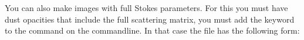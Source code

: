 \documentclass[letterpaper,10pt,english]{sphinxmanual}
\begin{document}
You can also make images with full Stokes parameters. For this you must have
dust opacities that include the full scattering matrix,  you must
add the keyword  to the  command
on the command\sphinxhyphen{}line. In that case the  file has the
following form:

\begin{sphinxVerbatim}[commandchars=\\\{\}]
                           
        
    
\PYG{p}{[}\PYG{p}{]}   \PYG{p}{[}\PYG{p}{]}


\end{sphinxVerbatim}
\end{document}
